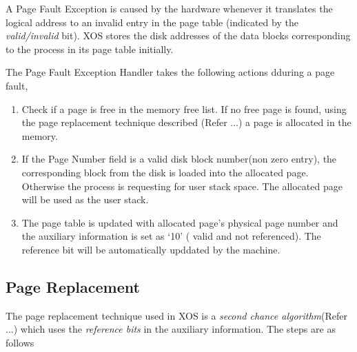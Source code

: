 \documentclass[10pt]{report}
\begin{document}
A Page Fault Exception is caused by the hardware whenever it translates the logical address to an invalid entry in the page table (indicated by the \textit{valid/invalid} bit). XOS stores the disk addresses of the data blocks corresponding to the process in its page table initially. 

The Page Fault Exception Handler takes the following actions dduring a page fault,
\begin{enumerate}
\item Check if a page is free in the memory free list. If no free page is found, using the page replacement technique described (Refer ...) a page is allocated in the memory.
\item If the Page Number field is a valid disk block number(non zero entry), the corresponding block from the disk is loaded into the allocated page. Otherwise the process is requesting for user stack space. The allocated page will be used as the user stack.
\item The page table is updated with allocated page's physical page number and the auxiliary information is set as `10' ( valid and not referenced). The reference bit will be automatically upddated by the machine.
\end{enumerate}

\subsection{Page Replacement}

The page replacement technique used in XOS is a \textit{second chance algorithm}(Refer ...) which uses the \textit{reference bits} in the auxiliary information. The steps are as follows
\end{document}
